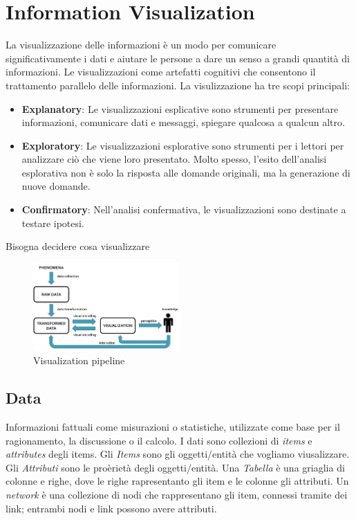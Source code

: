 \section{Information Visualization}
La visualizzazione delle informazioni è un modo per comunicare significativamente i dati e aiutare le persone a 
dare un senso a grandi quantità di informazioni.
Le visualizzazioni come artefatti cognitivi che consentono il trattamento parallelo delle informazioni.
La visulizzazione ha tre scopi principali:
\begin{itemize}
    \item \textbf{Explanatory}: Le visualizzazioni esplicative sono strumenti per presentare informazioni, comunicare dati e messaggi, spiegare qualcosa a qualcun altro.
    \item \textbf{Exploratory}: Le visualizzazioni esplorative sono strumenti per i lettori per analizzare ciò che viene loro presentato. Molto spesso, l'esito dell'analisi esplorativa non è solo la risposta alle domande originali, ma la generazione di nuove domande.
    \item \textbf{Confirmatory}: Nell'analisi confermativa, le visualizzazioni sono destinate a testare ipotesi.
\end{itemize}

Bisogna decidere cosa visualizzare 
\begin{figure}[H]
    \centering
    \includegraphics[width=0.5\textwidth]{images/visPipe2.png} %
    \caption{Visualization pipeline}
    \label{fig:immagine}
\end{figure}
\subsection{Data}
Informazioni fattuali come misurazioni o statistiche, utilizzate come base per il ragionamento, la discussione o il calcolo.
I dati sono collezioni di \textit{items} e \textit{attributes} degli items.
Gli \textit{Items} sono gli oggetti/entità che vogliamo viusalizzare.
Gli \textit{Attributi} sono le proèrietà degli oggetti/entità.
Una \textit{Tabella} è una griaglia di colonne e righe, dove le righe  rapresentanto gli item e le colonne gli attributi.
Un \textit{network} è una collezione di nodi che rappresentano gli item, connessi tramite dei link; entrambi nodi e link possono avere attributi.


